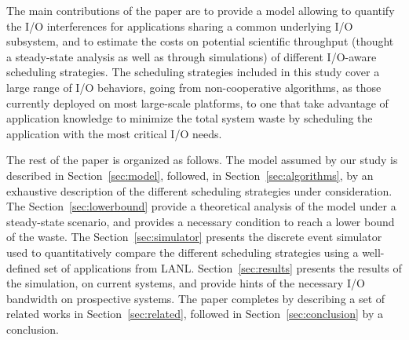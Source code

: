 The main contributions of the paper are to provide a model allowing to quantify
the I/O interferences for applications sharing a common underlying I/O
subsystem, and to estimate the costs on potential scientific throughput (thought
a steady-state analysis as well as through simulations) of different I/O-aware
scheduling strategies. The scheduling strategies included in this study cover a
large range of I/O behaviors, going from non-cooperative algorithms, as those
currently deployed on most large-scale platforms, to one that take advantage of
application knowledge to minimize the total system waste by scheduling the
application with the most critical I/O needs.

The rest of the paper is organized as follows. The model assumed by our study is
described in  Section~\ref{sec:model}, followed, in
Section~\ref{sec:algorithms}, by an exhaustive description of the different
scheduling strategies under consideration. The Section~\ref{sec:lowerbound}
provide a theoretical analysis of the model under a steady-state scenario, and
provides a necessary condition to reach a lower bound of the waste. The
Section~\ref{sec:simulator} presents the discrete event simulator used to
quantitatively compare the different scheduling strategies using a well-defined
set of applications from LANL. Section~\ref{sec:results} presents the results of
the simulation, on current systems, and provide hints of the necessary I/O
bandwidth on prospective systems. The paper completes by describing a set of
related works in Section~\ref{sec:related}, followed in
Section~\ref{sec:conclusion} by a conclusion.

